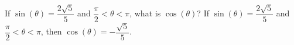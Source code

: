 {If $\sin(\theta) = \dfrac{2\sqrt{5}}{5}$ and $\dfrac{\pi}{2} < \theta < \pi$, what is $\cos(\theta)$?}
{If $\sin(\theta) = \dfrac{2\sqrt{5}}{5}$ and $\dfrac{\pi}{2} < \theta < \pi$, then $\cos(\theta) = -\dfrac{\sqrt{5}}{5}$.}